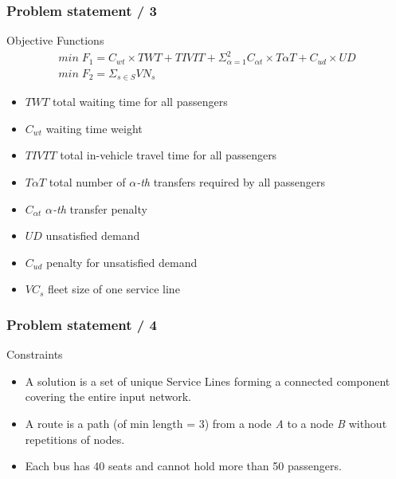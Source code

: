 \documentclass[dvipsnames]{beamer}
\begin{document}
\begin{frame}
  \frametitle{Problem statement / 3}
 
  \begin{block}{Objective Functions}
    \begin{equation}
      \label{eq:F1-F2}
      \begin{array}{l}
        min \; F_1 = C_{wt} \times TWT + TIVIT + \Sigma _ {\alpha = 1} ^ {2} C_{\alpha t} \times T\alpha T + C_{ud} \times UD \\
        min \; F_2 = \Sigma _ {s \in S} VN_{s}
      \end{array}
    \end{equation}
  \end{block}
 
  \begin{itemize}
    \item $TWT$ total waiting time for all passengers
    \item $C_{wt}$ waiting time weight
    \item $TIVTT$ total in-vehicle travel time for all passengers
    \item $T\alpha T$ total number of \textit{$\alpha$-th} transfers required by all passengers
    \item $C_{\alpha t}$ \textit{$\alpha$-th} transfer penalty
    \item $UD$ unsatisfied demand
    \item $C_{ud}$ penalty for unsatisfied demand
    \item $VC_{s}$ fleet size of one service line
  \end{itemize}
\end{frame}

\begin{frame}
  \frametitle{Problem statement / 4}
 
  \begin{alertblock}{Constraints}
    \begin{itemize}
      \item A solution is a set of unique Service Lines forming a connected component covering the entire input network.
      \item A route is a path (of min length = $3$) from a node \textit{A} to a node \textit{B} without repetitions of nodes.
      \item Each bus has 40 seats and cannot hold more than 50 passengers.
    \end{itemize}
  \end{alertblock}
\end{frame}
\end{document}
